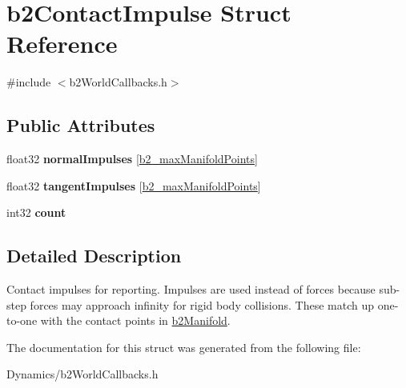 \hypertarget{structb2ContactImpulse}{}\section{b2\+Contact\+Impulse Struct Reference}
\label{structb2ContactImpulse}


{\ttfamily \#include $<$b2\+World\+Callbacks.\+h$>$}

\subsection*{Public Attributes}
\begin{DoxyCompactItemize}
\item 
\mbox{\label{structb2ContactImpulse_a553d3562a3a34ea013e2d9860f6fd207}} 
float32 {\bfseries normal\+Impulses} \mbox{[}\mbox{\hyperlink{b2Settings_8h_aa5f44cc9edf711433dea2b2ec94f3c42}{b2\+\_\+max\+Manifold\+Points}}\mbox{]}
\item 
\mbox{\label{structb2ContactImpulse_aebd9875b1f55a90865770a53e30e609a}} 
float32 {\bfseries tangent\+Impulses} \mbox{[}\mbox{\hyperlink{b2Settings_8h_aa5f44cc9edf711433dea2b2ec94f3c42}{b2\+\_\+max\+Manifold\+Points}}\mbox{]}
\item 
\mbox{\label{structb2ContactImpulse_a258e094ab0d769971f40d6c144420bf7}} 
int32 {\bfseries count}
\end{DoxyCompactItemize}


\subsection{Detailed Description}
Contact impulses for reporting. Impulses are used instead of forces because sub-\/step forces may approach infinity for rigid body collisions. These match up one-\/to-\/one with the contact points in \mbox{\hyperlink{structb2Manifold}{b2\+Manifold}}. 

The documentation for this struct was generated from the following file\+:\begin{DoxyCompactItemize}
\item 
Dynamics/b2\+World\+Callbacks.\+h\end{DoxyCompactItemize}

